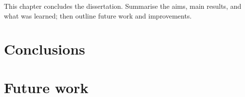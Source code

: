%

This chapter concludes the dissertation. Summarise the aims, main results, and what was learned; then outline future work and improvements.


\section{Conclusions}\label{sec:conclusions}


\section{Future work}\label{sec:future}

